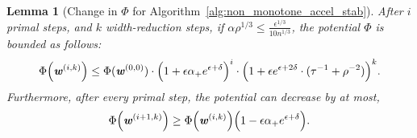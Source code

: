 \documentclass[11pt]{article}
\newtheorem{lemma}[theorem]{Lemma}
\let\originalleft\left
\let\originalright\right
\renewcommand{\left}{\mathopen{}\mathclose\bgroup\originalleft}
\renewcommand{\right}{\aftergroup\egroup\originalright}
\newcommand\ww{\boldsymbol{\mathit{w}}}
\begin{document}
\begin{lemma}[Change in $\Phi$ for Algorithm~\ref{alg:non_monotone_accel_stab}]\label{lem:ChangePhiStab}
After $i$ primal steps, and $k$ width-reduction steps, if $\alpha \rho^{1/3}\leq \frac{\epsilon^{1/3}}{10 n^{1/3}}$, the potential $\Phi$ is bounded as follows:
\begin{align*}
\Phi\left(\ww^{(i,k)}\right) \leq \Phi(\ww^{(0,0)}) \cdot \left(1+\epsilon\alpha_+ e^{\epsilon+\delta} \right)^i \cdot \left( 1 + \epsilon e^{\epsilon+2\delta} \cdot (\tau^{-1} + \rho^{-2}) \right)^k.
\end{align*}
Furthermore, after every primal step, the potential can decrease by at most,
 \[
 \Phi\left(\ww^{(i+1,k)}\right) \geq  \Phi\left(\ww^{(i,k)}\right)\left(1-\epsilon\alpha_+ e^{\epsilon+\delta}\right).  
 \]
\end{lemma}
\end{document}
